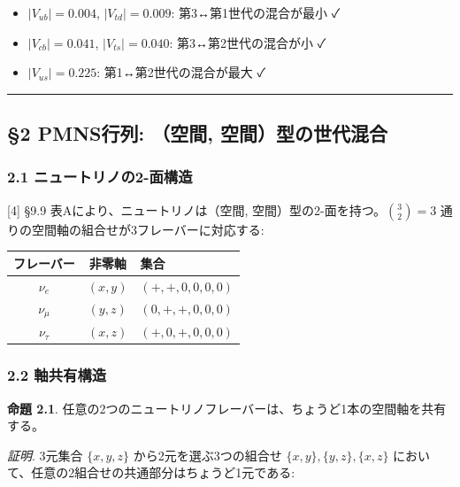 \documentclass[
  a4paper,11pt]{ltjsarticle}
\newcounter{none} %
\providecommand{\tightlist}{%
  \setlength{\itemsep}{0pt}\setlength{\parskip}{0pt}}
\begin{document}
\begin{itemize}
\tightlist
\item
  \(|V_{ub}| = 0.004\), \(|V_{td}| = 0.009\): 第3↔第1世代の混合が最小 ✓
\item
  \(|V_{cb}| = 0.041\), \(|V_{ts}| = 0.040\): 第3↔第2世代の混合が小 ✓
\item
  \(|V_{us}| = 0.225\): 第1↔第2世代の混合が最大 ✓
\end{itemize}

\begin{center}\rule{0.5\linewidth}{0.5pt}\end{center}

\subsection{§2 PMNS行列: （空間,
空間）型の世代混合}\label{pmnsux884cux5217-ux7a7aux9593-ux7a7aux9593ux578bux306eux4e16ux4ee3ux6df7ux5408}

\subsubsection{2.1
ニュートリノの2-面構造}\label{ux30cbux30e5ux30fcux30c8ux30eaux30ceux306e2-ux9762ux69cbux9020}

{[}4{]} §9.9 表Aにより、ニュートリノは（空間,
空間）型の2-面を持つ。\(\binom{3}{2} = 3\)
通りの空間軸の組合せが3フレーバーに対応する:

{\def\LTcaptype{none} %
\begin{longtable}[]{@{}ccl@{}}
\toprule\noalign{}
フレーバー & 非零軸 & 集合 \\
\midrule\noalign{}
\endhead
\bottomrule\noalign{}
\endlastfoot
\(\nu_e\) & \((x, y)\) & \((+, +, 0, 0, 0, 0)\) \\
\(\nu_\mu\) & \((y, z)\) & \((0, +, +, 0, 0, 0)\) \\
\(\nu_\tau\) & \((x, z)\) & \((+, 0, +, 0, 0, 0)\) \\
\end{longtable}
}

\subsubsection{2.2 軸共有構造}\label{ux8ef8ux5171ux6709ux69cbux9020}

\textbf{命題 2.1}.
任意の2つのニュートリノフレーバーは、ちょうど1本の空間軸を共有する。

\emph{証明}. 3元集合 \(\{x, y, z\}\) から2元を選ぶ3つの組合せ
\(\{x,y\}, \{y,z\}, \{x,z\}\)
において、任意の2組合せの共通部分はちょうど1元である:
\end{document}
